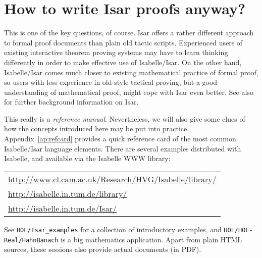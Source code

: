 \section{How to write Isar proofs anyway?}

This is one of the key questions, of course.  Isar offers a rather different
approach to formal proof documents than plain old tactic scripts.  Experienced
users of existing interactive theorem proving systems may have to learn
thinking differently in order to make effective use of Isabelle/Isar.  On the
other hand, Isabelle/Isar comes much closer to existing mathematical practice
of formal proof, so users with less experience in old-style tactical proving,
but a good understanding of mathematical proof, might cope with Isar even
better.  See also \cite{Wenzel:1999:TPHOL} for further background information
on Isar.

\medskip This really is a \emph{reference manual}.  Nevertheless, we will also
give some clues of how the concepts introduced here may be put into practice.
Appendix~\ref{ap:refcard} provides a quick reference card of the most common
Isabelle/Isar language elements.  There are several examples distributed with
Isabelle, and available via the Isabelle WWW library:
\begin{center}\small
  \begin{tabular}{l}
    \url{http://www.cl.cam.ac.uk/Research/HVG/Isabelle/library/} \\
    \url{http://isabelle.in.tum.de/library/} \\
    \url{http://isabelle.in.tum.de/Isar/} \\
  \end{tabular}
\end{center}

See \texttt{HOL/Isar_examples} for a collection of introductory examples, and
\texttt{HOL/HOL-Real/HahnBanach} is a big mathematics application.  Apart from
plain HTML sources, these sessions also provide actual documents (in PDF).

